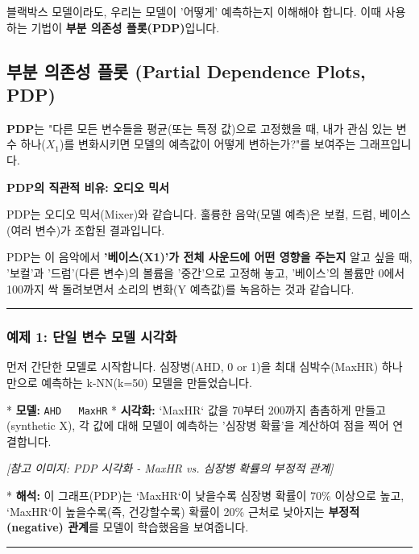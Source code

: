 \documentclass[11pt,a4paper]{book}
\theoremstyle{definition}
\begin{document}
블랙박스 모델이라도, 우리는 모델이 '어떻게' 예측하는지 이해해야 합니다. 이때 사용하는 기법이 \textbf{부분 의존성 플롯(PDP)}입니다.

\subsection{부분 의존성 플롯 (Partial Dependence Plots, PDP)}

\textbf{PDP}는 "다른 모든 변수들을 평균(또는 특정 값)으로 고정했을 때, 내가 관심 있는 변수 하나(\(X_1\))를 변화시키면 모델의 예측값이 어떻게 변하는가?"를 보여주는 그래프입니다.

\begin{examplebox}[title={예제}]
    \textbf{PDP의 직관적 비유: 오디오 믹서}

    PDP는 오디오 믹서(Mixer)와 같습니다. 훌륭한 음악(모델 예측)은 보컬, 드럼, 베이스(여러 변수)가 조합된 결과입니다.

    PDP는 이 음악에서 \textbf{'베이스(X1)'가 전체 사운드에 어떤 영향을 주는지} 알고 싶을 때, '보컬'과 '드럼'(다른 변수)의 볼륨을 '중간'으로 고정해 놓고, '베이스'의 볼륨만 0에서 100까지 싹 돌려보면서 소리의 변화(Y 예측값)를 녹음하는 것과 같습니다.
\end{examplebox}

\vspace{0.5cm}\hrule\vspace{0.5cm}
\subsubsection{예제 1: 단일 변수 모델 시각화}

먼저 간단한 모델로 시작합니다. 심장병(AHD, 0 or 1)을 최대 심박수(MaxHR) 하나만으로 예측하는 k-NN(k=50) 모델을 만들었습니다.

* \textbf{모델:} \texttt{AHD ~ MaxHR}
* \textbf{시각화:} `MaxHR` 값을 70부터 200까지 촘촘하게 만들고(synthetic X), 각 값에 대해 모델이 예측하는 '심장병 확률'을 계산하여 점을 찍어 연결합니다.

\textit{[참고 이미지: PDP 시각화 - MaxHR vs. 심장병 확률의 부정적 관계]}

* \textbf{해석:} 이 그래프(PDP)는 `MaxHR`이 낮을수록 심장병 확률이 70\% 이상으로 높고, `MaxHR`이 높을수록(즉, 건강할수록) 확률이 20\% 근처로 낮아지는 \textbf{부정적(negative) 관계}를 모델이 학습했음을 보여줍니다.

\vspace{0.5cm}\hrule\vspace{0.5cm}
\end{document}

